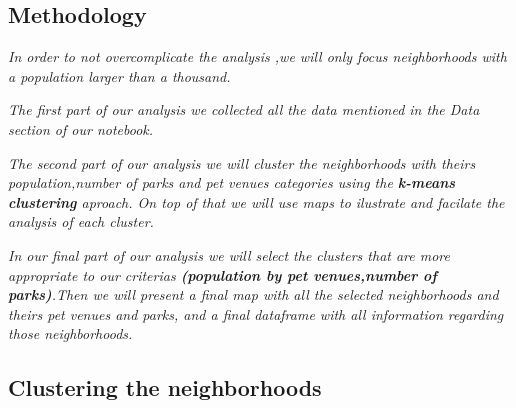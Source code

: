 \documentclass[11pt]{article}
\begin{document}
    \hypertarget{methodology}{%
\subsection{Methodology}\label{methodology}}

    \emph{In order to not overcomplicate the analysis ,we will only focus
neighborhoods with a population larger than a thousand.}

\emph{The first part of our analysis we collected all the data mentioned
in the Data section of our notebook.}

\emph{The second part of our analysis we will cluster the neighborhoods
with theirs population,number of parks and pet venues categories using
the \textbf{k-means clustering} aproach. On top of that we will use maps
to ilustrate and facilate the analysis of each cluster.}

\emph{In our final part of our analysis we will select the clusters that
are more appropriate to our criterias \textbf{(population by pet
venues,number of parks)}.Then we will present a final map with all the
selected neighborhoods and theirs pet venues and parks, and a final
dataframe with all information regarding those neighborhoods.}

    \hypertarget{clustering-the-neighborhoods}{%
\subsection{Clustering the
neighborhoods}\label{clustering-the-neighborhoods}}
\end{document}
